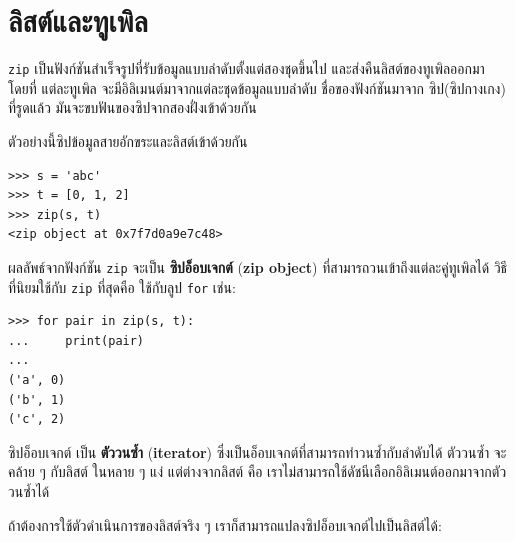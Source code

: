 \section{ลิสต์และทูเพิล}

%
\texttt{zip} เป็นฟังก์ชันสำเร็จรูปที่รับข้อมูลแบบลำดับตั้งแต่สองชุดขึ้นไป
และส่งคืนลิสต์ของทูเพิลออกมา
โดยที่ แต่ละทูเพิล จะมีอิลิเมนต์มาจากแต่ละชุดข้อมูลแบบลำดับ
ชื่อของฟังก์ชันมาจาก ซิป(ซิปกางเกง) 
ที่รูดแล้ว มันจะขบฟันของซิปจากสองฝั่งเข้าด้วยกัน

%
ตัวอย่างนี้ซิปข้อมูลสายอักขระและลิสต์เข้าด้วยกัน
\begin{verbatim}
>>> s = 'abc'
>>> t = [0, 1, 2]
>>> zip(s, t)
<zip object at 0x7f7d0a9e7c48>
\end{verbatim}
%
%
ผลลัพธ์จากฟังก์ชัน \texttt{zip} จะเป็น \textbf{ซิปอ็อบเจกต์} (\textbf{zip object})
ที่สามารถวนเข้าถึงแต่ละคู่ทูเพิลได้
วิธีที่นิยมใช้กับ \texttt{zip} ที่สุดคือ ใช้กับลูป \texttt{for} เช่น:

\begin{verbatim}
>>> for pair in zip(s, t):
...     print(pair)
...
('a', 0)
('b', 1)
('c', 2)
\end{verbatim}
%
%
ซิปอ็อบเจกต์ เป็น \textbf{ตัววนซ้ำ} (\textbf{iterator})
ซึ่งเป็นอ็อบเจกต์ที่สามารถทำวนซ้ำกับลำดับได้
ตัววนซ้ำ จะคล้าย ๆ กับลิสต์ ในหลาย ๆ แง่
แต่ต่างจากลิสต์ คือ เราไม่สามารถใช้ดัชนีเลือกอิลิเมนต์ออกมาจากตัววนซ้ำได้
%


%
ถ้าต้องการใช้ตัวดำเนินการของลิสต์จริง ๆ
เราก็สามารถแปลงซิปอ็อบเจกต์ไปเป็นลิสต์ได้:

